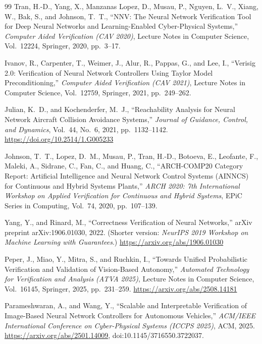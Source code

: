 \documentclass[twocolumn,smallextended,runningheads]{svjour3}
\begin{document}
\begin{thebibliography}{99}
Tran, H.-D., Yang, X., Manzanas Lopez, D., Musau, P., Nguyen, L.~V., Xiang, W., Bak, S., and Johnson, T.~T., ``NNV: The Neural Network Verification Tool for Deep Neural Networks and Learning-Enabled Cyber-Physical Systems,'' \emph{Computer Aided Verification (CAV 2020)}, Lecture Notes in Computer Science, Vol.~12224, Springer, 2020, pp.~3--17.

Ivanov, R., Carpenter, T., Weimer, J., Alur, R., Pappas, G., and Lee, I., ``Verisig 2.0: Verification of Neural Network Controllers Using Taylor Model Preconditioning,'' \emph{Computer Aided Verification (CAV 2021)}, Lecture Notes in Computer Science, Vol.~12759, Springer, 2021, pp.~249--262.

Julian, K.~D., and Kochenderfer, M.~J., ``Reachability Analysis for Neural Network Aircraft Collision Avoidance Systems,'' \emph{Journal of Guidance, Control, and Dynamics}, Vol.~44, No.~6, 2021, pp.~1132--1142. \url{https://doi.org/10.2514/1.G005233}

Johnson, T.~T., Lopez, D.~M., Musau, P., Tran, H.-D., Botoeva, E., Leofante, F., Maleki, A., Sidrane, C., Fan, C., and Huang, C., ``ARCH-COMP20 Category Report: Artificial Intelligence and Neural Network Control Systems (AINNCS) for Continuous and Hybrid Systems Plants,'' \emph{ARCH 2020: 7th International Workshop on Applied Verification for Continuous and Hybrid Systems}, EPiC Series in Computing, Vol.~74, 2020, pp.~107--139.

Yang, Y., and Rinard, M., ``Correctness Verification of Neural Networks,'' arXiv preprint arXiv:1906.01030, 2022. (Shorter version: \emph{NeurIPS 2019 Workshop on Machine Learning with Guarantees}.) \url{https://arxiv.org/abs/1906.01030}

Peper, J., Miao, Y., Mitra, S., and Ruchkin, I., ``Towards Unified Probabilistic Verification and Validation of Vision-Based Autonomy,'' \emph{Automated Technology for Verification and Analysis (ATVA 2025)}, Lecture Notes in Computer Science, Vol.~16145, Springer, 2025, pp.~231--259. \url{https://arxiv.org/abs/2508.14181}

Parameshwaran, A., and Wang, Y., ``Scalable and Interpretable Verification of Image-Based Neural Network Controllers for Autonomous Vehicles,'' \emph{ACM/IEEE International Conference on Cyber-Physical Systems (ICCPS 2025)}, ACM, 2025. \url{https://arxiv.org/abs/2501.14009}, doi:10.1145/3716550.3722037.


\end{thebibliography}
\end{document}
